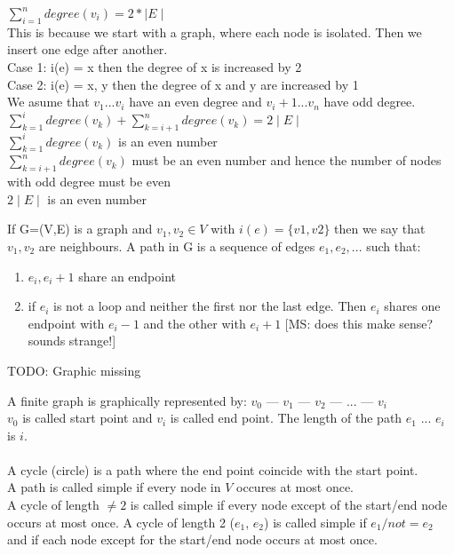 \begin{prooof}
    $\sum\limits_{i=1}^n degree(v{_i}) = 2* \mid E \mid$ \\
This is because we start with a graph, where each node is isolated. Then we insert one edge after another.\\
Case 1: i(e) = {x} then the degree of x is increased by 2\\
Case 2: i(e) = {x, y} then the degree of x and y are increased by 1\\
We asume that $v{_1}...v{_i}$ have an even degree and $v{_i+1}...v{_n}$ have odd degree.\\

$\sum\limits_{k=1}^i degree(v{_k}) + \sum\limits_{k=i+1}^n degree(v{_k}) = 2 \mid E \mid$\\

$\sum\limits_{k=1}^i degree(v{_k})$ is an even number\\

$\sum\limits_{k=i+1}^n degree(v{_k})$ must be an even number and hence the number of nodes with odd degree must be even\\

$ 2 \mid E \mid$ is an even number \\

\end{prooof}


\begin{definition}
    If G=(V,E) is a graph and $v{_1}, v{_2} \in V$ with $i(e) = \{v1, v2\}$ then we say that $v{_1}, v{_2}$ are neighbours. A path in G is a sequence of edges $e{_1}, e{_2}, ...$ such that: \\
\begin{enumerate}
\item $e{_i}, e{_i+1}$ share an endpoint
\item if $e{_i}$ is not a loop and neither the first nor the last edge. Then $e{_i}$ shares one endpoint with $e{_i-1}$ and the other with $e{_i+1}$ [MS: does this make sense? sounds strange!]
\end{enumerate}
\end{definition}

\begin{example*}
TODO: Graphic missing\\
\end{example*}

A finite graph is graphically represented by: $v{_0}$ --- $v{_1}$ --- $v{_2}$ --- ... --- $v{_i}$\\
$v{_0}$ is called start point and $v{_i}$ is called end point. The length of the path $e{_1}$ ... $e{_i}$  is $i$.\\
\\
A cycle (circle) is a path where the end point coincide with the start point.\\
A path is called simple if every node in $V$ occures at most once.\\
A cycle of length $\not = 2$ is called simple if every node except of the start/end node occurs at most once. A cycle of length 2 ($e{_1}$, $e{_2}$) is called simple if $e{_1} /not = e{_2}$ and if each node except for the start/end node occurs at most once.

